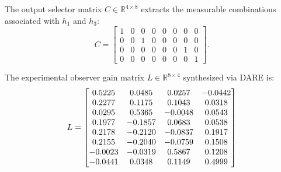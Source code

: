 \documentclass[asi,article,accept,pdftex,moreauthors]{Definitions/mdpi}
\begin{document}
{The output selector matrix $C \in \mathbb{R}^{4 \times 8}$ extracts the measurable combinations associated with $h_1$ and $h_3$:
\begin{equation}
C = \begin{bmatrix}
1 & 0 & 0 & 0 & 0 & 0 & 0 & 0 \\
0 & 0 & 1 & 0 & 0 & 0 & 0 & 0 \\
0 & 0 & 0 & 0 & 0 & 0 & 1 & 0 \\
0 & 0 & 0 & 0 & 0 & 0 & 0 & 1
\end{bmatrix}.
\end{equation}

The experimental observer gain matrix $L \in \mathbb{R}^{8 \times 4}$ synthesized via DARE is:
\begin{equation}
\resizebox{0.6\linewidth}{!}{$
L = \begin{bmatrix}
  0.5225 & 0.0485 & 0.0257 & -0.0442 \\
  0.2277 & 0.1175 & 0.1043 & 0.0318 \\
  0.0295 & 0.5365 & -0.0048 & 0.0543 \\
  0.1977 & -0.1857 & 0.0683 & 0.0538 \\
  0.2178 & -0.2120 & -0.0837 & 0.1917 \\
  0.2155 & -0.2040 & -0.0759 & 0.1508 \\
  -0.0023 & -0.0319 & 0.5867 & 0.1208 \\
  -0.0441 & 0.0348 & 0.1149 & 0.4999
\end{bmatrix}
$}
\end{equation}
}
\end{document}
